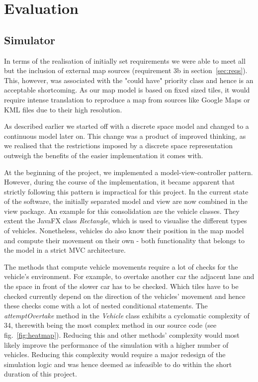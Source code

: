 \section{Evaluation}
\subsection{Simulator}\label{ss:eval_sim}
In terms of the realisation of initially set requirements we were able to meet all but the inclusion of external map sources (requirement 3b in section~\ref{sec:reqs}). This, however, was associated with the "could have" priority class and hence is an acceptable shortcoming. As our map model is based on fixed sized tiles, it would require intense translation to reproduce a map from sources like Google Maps or KML files due to their high resolution. 

As described earlier we started off with a discrete space model and changed to a continuous model later on. This change was a product of improved thinking, as we realised that the restrictions imposed by a discrete space representation outweigh the benefits of the easier implementation it comes with.

At the beginning of the project, we implemented a model-view-controller pattern. However, during the course of the implementation, it became apparent that strictly following this pattern is impractical for this project. In the current state of the software, the initially separated model and view are now combined in the view package. An example for this consolidation are the vehicle classes. They extent the JavaFX class \textit{Rectangle}, which is used to visualise the different types of vehicles. Nonetheless, vehicles do also know their position in the map model and compute their movement on their own - both functionality that belongs to the model in a strict MVC architecture.

The methods that compute vehicle movements require a lot of checks for the vehicle's environment. For example, to overtake another car the adjacent lane and the space in front of the slower car has to be checked. Which tiles have to be checked currently depend on the direction of the vehicles' movement and hence these checks come with a lot of nested conditional statements. The \textit{attemptOvertake} method in the \textit{Vehicle} class exhibits a cyclomatic complexity of 34, therewith being the most complex method in our source code (see fig.~\ref{fig:heatmap}). Reducing this and other methods' complexity would most likely improve the performance of the simulation with a higher number of vehicles. Reducing this complexity would require a major redesign of the simulation logic and was hence deemed as infeasible to do within the short duration of this project.

